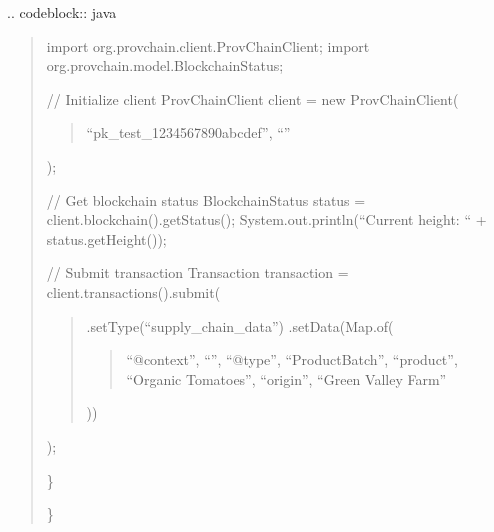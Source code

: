 \documentclass[letterpaper,10pt,english]{sphinxmanual}
\begin{document}
\sphinxAtStartPar
{}
.. code\sphinxhyphen{}block:: java
\begin{quote}

\sphinxAtStartPar
import org.provchain.client.ProvChainClient;
import org.provchain.model.BlockchainStatus;
\begin{description}
\begin{description}
\sphinxAtStartPar
// Initialize client
ProvChainClient client = new ProvChainClient(
\begin{quote}

\sphinxAtStartPar
“pk\_test\_1234567890abcdef”,
“”
\end{quote}

\sphinxAtStartPar
);

\sphinxAtStartPar
// Get blockchain status
BlockchainStatus status = client.blockchain().getStatus();
System.out.println(“Current height: “ + status.getHeight());

\sphinxAtStartPar
// Submit transaction
Transaction transaction = client.transactions().submit(
\begin{quote}
\begin{description}
\sphinxAtStartPar
.setType(“supply\_chain\_data”)
.setData(Map.of(
\begin{quote}

\sphinxAtStartPar
“@context”, “”,
“@type”, “ProductBatch”,
“product”, “Organic Tomatoes”,
“origin”, “Green Valley Farm”
\end{quote}

\sphinxAtStartPar
))

\end{description}
\end{quote}

\sphinxAtStartPar
);

\end{description}

\sphinxAtStartPar
\}

\end{description}

\sphinxAtStartPar
\}
\end{quote}
\end{document}
